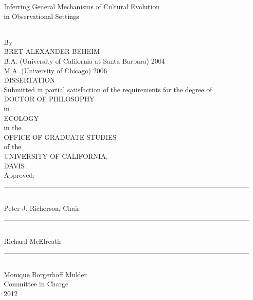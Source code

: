 \documentclass[letterpaper, 12pt, oneside]{book}
\begin{document}
\begin{center}
\begin{Large}Inferring General Mechanisms of Cultural Evolution \\ in Observational Settings\end{Large}\\
\vspace{\baselineskip}
By\\
\vspace{\baselineskip}
BRET ALEXANDER BEHEIM\\
B.A. (University of California at Santa Barbara) 2004 \\ M.A. (University of Chicago) 2006 \\
\vspace{\baselineskip}
DISSERTATION\\
\vspace{\baselineskip}
Submitted in partial satisfaction of the requirements for the degree of\\
\vspace{\baselineskip}
DOCTOR OF PHILOSOPHY\\
\vspace{\baselineskip}
in\\
\vspace{\baselineskip}
ECOLOGY\\
\vspace{\baselineskip}
in the\\
\vspace{\baselineskip}
OFFICE OF GRADUATE STUDIES\\
\vspace{\baselineskip}
of the\\
\vspace{\baselineskip}
UNIVERSITY OF CALIFORNIA,\\
\vspace{\baselineskip}
DAVIS\\
\vspace{\baselineskip}
Approved:\\
\vspace{\baselineskip}
\rule{2.5in}{1pt}\\
Peter J. Richerson, Chair \\
\vspace{\baselineskip}
\rule{2.5in}{1pt}\\
Richard McElreath \\
\vspace{\baselineskip}
\rule{2.5in}{1pt}\\
Monique Borgerhoff Mulder \\
\vspace{\baselineskip}
Committee in Charge\\
\vspace{\baselineskip}
2012\\


    \end{center}
    
\end{document}
